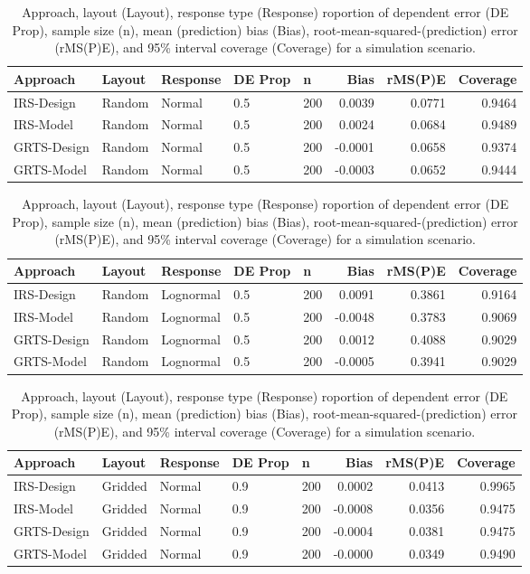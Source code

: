 \documentclass[]{elsarticle} %
\begin{document}
\begin{table}[ht]
\centering
\begin{tabular}{lllllrrr}
  \hline
Approach & Layout & Response & DE Prop & n & Bias & rMS(P)E & Coverage \\ 
  \hline
IRS-Design & Random & Normal & 0.5 & 200 & 0.0039 & 0.0771 & 0.9464 \\ 
  IRS-Model & Random & Normal & 0.5 & 200 & 0.0024 & 0.0684 & 0.9489 \\ 
  GRTS-Design & Random & Normal & 0.5 & 200 & -0.0001 & 0.0658 & 0.9374 \\ 
  GRTS-Model & Random & Normal & 0.5 & 200 & -0.0003 & 0.0652 & 0.9444 \\ 
   \hline
\end{tabular}
\caption{Approach, layout (Layout), response type (Response) roportion of dependent error (DE Prop), sample size (n), mean (prediction) bias (Bias), root-mean-squared-(prediction) error (rMS(P)E), and 95\% interval coverage (Coverage) for a simulation scenario.} 
\end{table}
\begin{table}[ht]
\centering
\begin{tabular}{lllllrrr}
  \hline
Approach & Layout & Response & DE Prop & n & Bias & rMS(P)E & Coverage \\ 
  \hline
IRS-Design & Random & Lognormal & 0.5 & 200 & 0.0091 & 0.3861 & 0.9164 \\ 
  IRS-Model & Random & Lognormal & 0.5 & 200 & -0.0048 & 0.3783 & 0.9069 \\ 
  GRTS-Design & Random & Lognormal & 0.5 & 200 & 0.0012 & 0.4088 & 0.9029 \\ 
  GRTS-Model & Random & Lognormal & 0.5 & 200 & -0.0005 & 0.3941 & 0.9029 \\ 
   \hline
\end{tabular}
\caption{Approach, layout (Layout), response type (Response) roportion of dependent error (DE Prop), sample size (n), mean (prediction) bias (Bias), root-mean-squared-(prediction) error (rMS(P)E), and 95\% interval coverage (Coverage) for a simulation scenario.} 
\end{table}
\begin{table}[ht]
\centering
\begin{tabular}{lllllrrr}
  \hline
Approach & Layout & Response & DE Prop & n & Bias & rMS(P)E & Coverage \\ 
  \hline
IRS-Design & Gridded & Normal & 0.9 & 200 & 0.0002 & 0.0413 & 0.9965 \\ 
  IRS-Model & Gridded & Normal & 0.9 & 200 & -0.0008 & 0.0356 & 0.9475 \\ 
  GRTS-Design & Gridded & Normal & 0.9 & 200 & -0.0004 & 0.0381 & 0.9475 \\ 
  GRTS-Model & Gridded & Normal & 0.9 & 200 & -0.0000 & 0.0349 & 0.9490 \\ 
   \hline
\end{tabular}
\caption{Approach, layout (Layout), response type (Response) roportion of dependent error (DE Prop), sample size (n), mean (prediction) bias (Bias), root-mean-squared-(prediction) error (rMS(P)E), and 95\% interval coverage (Coverage) for a simulation scenario.} 
\end{table}
\end{document}
